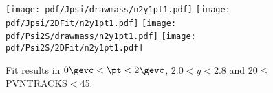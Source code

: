\begin{figure}[H]
\begin{center}
\texttt{[image: pdf/Jpsi/drawmass/n2y1pt1.pdf]}
\texttt{[image: pdf/Jpsi/2DFit/n2y1pt1.pdf]}
\vspace*{-0.5cm}
\texttt{[image: pdf/Psi2S/drawmass/n2y1pt1.pdf]}
\texttt{[image: pdf/Psi2S/2DFit/n2y1pt1.pdf]}
\vspace*{-0.5cm}
\end{center}
\caption{Fit results in $0\gevc<\pt<2\gevc$, $2.0<y<2.8$ and 20$\leq$PVNTRACKS$<$45.}
\label{Fitn2y1pt1}
\end{figure}
